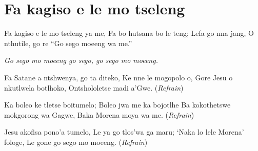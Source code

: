 \starttocol
\chapter{Fa kagiso e le mo tseleng}
\nexttocol
\hfill{\it }
\stoptocol
\starttocol
\startlines
{\sc Fa} kagiso e le mo tseleng ya me, 
Fa bo hutsana bo le teng;  
Lefa go nna jang,  
O nthutile, go re ``Go sego moeeng wa me.''

{\it 
Go sego mo moeeng go sego, 
go sego mo moeeng.}

Fa Satane a ntshwenya, go ta diteko, 
Ke nne le mogopolo o,
Gore Jesu o nkutlwela botlhoko, 
Ontshololetse madi  a'Gwe.  
          \hfill({\it Refrain})~~~~~~~~~

Ka boleo ke tletse boitumelo; 
Boleo jwa me ka bojotlhe  
Ba kokothetswe mokgorong wa Gagwe, 
Baka Morena moya wa me.  
          \hfill({\it Refrain})~~~~~~~~~

Jesu akofisa pono'a tumelo,
Le ya go tlos'wa ga maru;
`Naka lo lele Morena' fologe,
Le gone go sego mo moeeng.
          \hfill({\it Refrain})~~~~~~~~~
\stoplines
\nexttocol

\stoptocol

